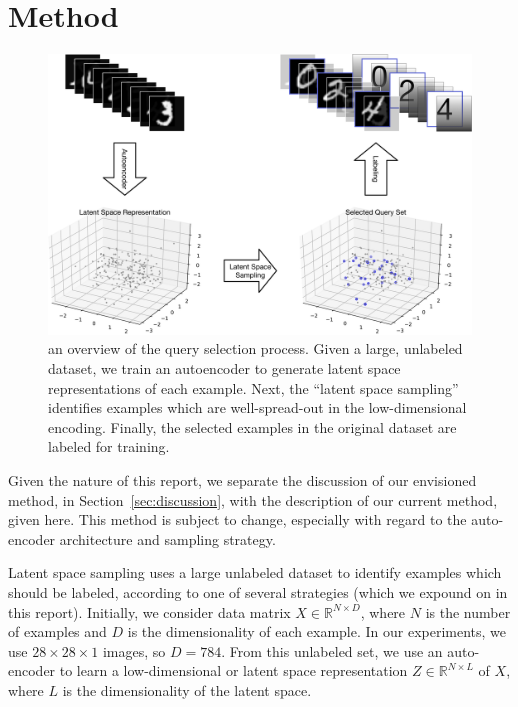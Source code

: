 \documentclass[a4paper]{article}
\begin{document}
\section{Method}
\label{sec:method}

\begin{figure}
  \centering
  \includegraphics[width=0.9\linewidth]{overview}
  \caption{an overview of the query selection process. Given a large, unlabeled
    dataset, we train an autoencoder to generate latent space representations of
    each example. Next, the ``latent space sampling'' identifies examples which
    are well-spread-out in the low-dimensional encoding. Finally, the selected
    examples in the original dataset are labeled for training.}
  \label{fig:overview}
\end{figure}

Given the nature of this report, we separate the discussion of our envisioned
method, in Section~\ref{sec:discussion}, with the description of our current
method, given here. This method is subject to change, especially with regard to
the auto-encoder architecture and sampling strategy.

Latent space sampling uses a large unlabeled dataset to identify examples which
should be labeled, according to one of several strategies (which we expound on
in this report). Initially, we consider data matrix
$X \in \mathbb{R}^{N\times D}$, where $N$ is the number of examples and $D$ is
the dimensionality of each example. In our experiments, we use
$28 \times 28 \times 1$ images, so $D = 784$. From this unlabeled set, we use an
auto-encoder to learn a low-dimensional or latent space representation
$Z \in \mathbb{R}^{N\times L}$ of $X$, where $L$ is the dimensionality of the
latent space.
\end{document}
